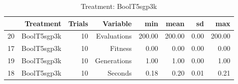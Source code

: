 \begin{table}[ht]
\centering
\begin{tabular}{rrrrrrrr}
  \hline
 & Treatment & Trials & Variable & min & mean & sd & max \\ 
  \hline
20 & BoolT5sgp3k &  10 & Evaluations & 200.00 & 200.00 & 0.00 & 200.00 \\ 
  17 & BoolT5sgp3k &  10 & Fitness & 0.00 & 0.00 & 0.00 & 0.00 \\ 
  19 & BoolT5sgp3k &  10 & Generations & 1.00 & 1.00 & 0.00 & 1.00 \\ 
  18 & BoolT5sgp3k &  10 & Seconds & 0.18 & 0.20 & 0.01 & 0.21 \\ 
   \hline
\end{tabular}
\caption{Treatment: BoolT5sgp3k} 
\end{table}
